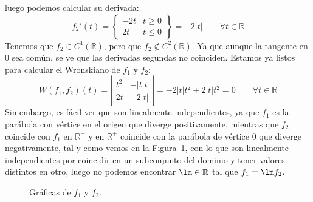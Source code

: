 \begin{ejemplo}
    luego podemos calcular su derivada:
    \begin{equation*}
        f_2'(t) = \left\{\begin{array}{rr}
                -2t & t \geq 0 \\
                2t & t \leq 0
        \end{array}\right\} = -2 |t| \qquad \forall t\in \mathbb{R}
    \end{equation*}
    Tenemos que $f_2\in C^1(\mathbb{R})$, pero que $f_2\notin C^2(\mathbb{R})$. Ya que aunque la tangente en 0 sea común, se ve que las derivadas segundas no coinciden. Estamos ya listos para calcular el Wronskiano de $f_1$ y $f_2$:
    \begin{equation*}
        W(f_1,f_2)(t) = \left|\begin{array}{cc}
            t^2  & -|t|t \\
            2t & -2|t|
        \end{array}\right| = -2|t|t^2 + 2|t|t^2 = 0 \qquad \forall t\in \mathbb{R}
    \end{equation*}
    Sin embargo, es fácil ver que son linealmente independientes, ya que $f_1$ es la parábola con vértice en el origen que diverge positivamente, mientras que $f_2$ coincide con $f_1$ en $\mathbb{R}^-$ y en $\mathbb{R}^+$ coincide con la parábola de vértice 0 que diverge negativamente, tal y como vemos en la Figura~\ref{fig:reciproco_wr}, con lo que son linealmente independientes por coincidir en un subconjunto del dominio y tener valores distintos en otro, luego no podemos encontrar $\lm\in \mathbb{R}$ tal que $f_1=\lm f_2$.
\begin{figure}[H]
\centering    
{}
\caption{Gráficas de $f_1$ y $f_2$.}
\label{fig:reciproco_wr}
\end{figure}
\end{ejemplo}


